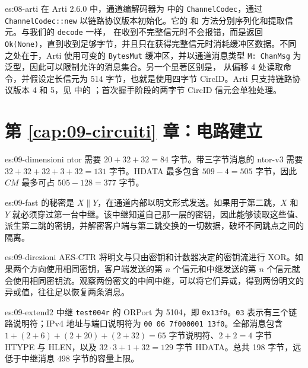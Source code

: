 \begin{soluzione}{es:08-arti}
在 Arti 2.6.0 中，通道编解码器为  中的 \texttt{ChannelCodec}，通过 \texttt{ChannelCodec::new} 以链路协议版本初始化。它的  和  方法分别序列化和提取信元。与我们的 \texttt{decode} 一样， 在收到不完整信元时不会报错，而是返回 \texttt{Ok(None)}，直到收到足够字节，并且只在获得完整信元时消耗缓冲区数据。不同之处在于，Arti 使用可变的 \texttt{BytesMut} 缓冲区，并以通道消息类型 \texttt{M: ChanMsg} 为泛型，因此可以限制允许的消息集合。另一个显著区别是， 从偏移 4 处读取命令，并假设定长信元为 514 字节，也就是使用四字节 CircID。Arti 只支持链路协议版本 4 和 5，见  中的 ；首次握手阶段的两字节 CircID  信元会单独处理。
\end{soluzione}

\section*{第 \ref{cap:09-circuiti} 章：电路建立}

\begin{soluzione}{es:09-dimensioni}
ntor 需要 $20+32+32=84$ 字节。带三字节消息的 ntor-v3 需要 $32+32+32+3+32=131$ 字节。HDATA 最多包含 $509-4=505$ 字节，因此 $CM$ 最多可占 $505-128=377$ 字节。
\end{soluzione}

\begin{soluzione}{es:09-fast}
 的秘密是 $X\|Y$，在通道内部以明文形式发送。如果用于第二跳，$X$ 和 $Y$ 就必须穿过第一台中继。该中继知道自己那一层的密钥，因此能够读取这些值、派生第二跳的密钥，并解密客户端与第二跳交换的一切数据，破坏不同跳点之间的隔离。
\end{soluzione}

\begin{soluzione}{es:09-direzioni}
AES-CTR 将明文与只由密钥和计数器决定的密钥流进行 XOR。如果两个方向使用相同密钥，客户端发送的第 $n$ 个信元和中继发送的第 $n$ 个信元就会使用相同密钥流。观察两份密文的中间中继，可以将它们异或，得到两份明文的异或值，往往足以恢复两条消息。
\end{soluzione}

\begin{soluzione}{es:09-extend2}
中继 \texttt{test004r} 的 ORPort 为 5104，即 \texttt{0x13f0}。\texttt{03} 表示有三个链路说明符；IPv4 地址与端口说明符为 \texttt{00 06 7f000001 13f0}。全部消息包含 $1+(2+6)+(2+20)+(2+32)=65$ 字节说明符、$2+2=4$ 字节 HTYPE 与 HLEN，以及 $32\cdot3+1+32=129$ 字节 HDATA。总共 198 字节，远低于中继消息 498 字节的容量上限。
\end{soluzione}

